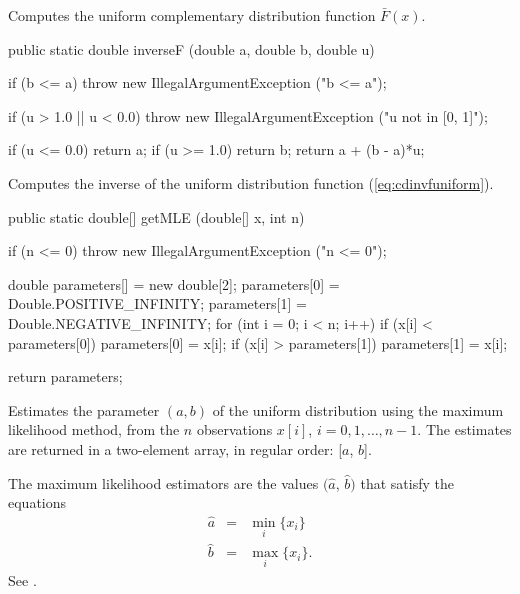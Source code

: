  \begin{tabb}
  Computes the uniform complementary distribution function
  $\bar{F}(x)$.
 \end{tabb}
\begin{code}

   public static double inverseF (double a, double b, double u)\begin{hide} {
       if (b <= a)
           throw new IllegalArgumentException ("b <= a");

       if (u > 1.0 || u < 0.0)
           throw new IllegalArgumentException ("u not in [0, 1]");

       if (u <= 0.0)
           return a;
       if (u >= 1.0)
           return b;
       return a + (b - a)*u;
   }\end{hide}
\end{code}
  \begin{tabb}
  Computes the inverse of the uniform distribution function
 (\ref{eq:cdinvfuniform}).
 \end{tabb}
\begin{code}

   public static double[] getMLE (double[] x, int n)\begin{hide} {
      if (n <= 0)
         throw new IllegalArgumentException ("n <= 0");

      double parameters[] = new double[2];
      parameters[0] = Double.POSITIVE_INFINITY;
      parameters[1] = Double.NEGATIVE_INFINITY;
      for (int i = 0; i < n; i++) {
         if (x[i] < parameters[0])
            parameters[0] = x[i];
         if (x[i] > parameters[1])
            parameters[1] = x[i];
      }

      return parameters;
   }\end{hide}
\end{code}
\begin{tabb}
   Estimates the parameter $(a, b)$ of the uniform distribution
   using the maximum likelihood method, from the $n$ observations
   $x[i]$, $i = 0, 1, \ldots, n-1$. The estimates are returned in a two-element
    array, in regular order: [$a$, $b$].
   \begin{detailed}
   The maximum likelihood estimators are the values
   $(\hat{a}$, $\hat{b})$ that satisfy the equations
   \begin{eqnarray*}
      \hat{a} & = & \min_i \{x_i\}\\
      \hat{b} & = & \max_i \{x_i\}.
   \end{eqnarray*}
     See  \cite[page 300]{sLAW00a}.
   \end{detailed}
\end{tabb}
